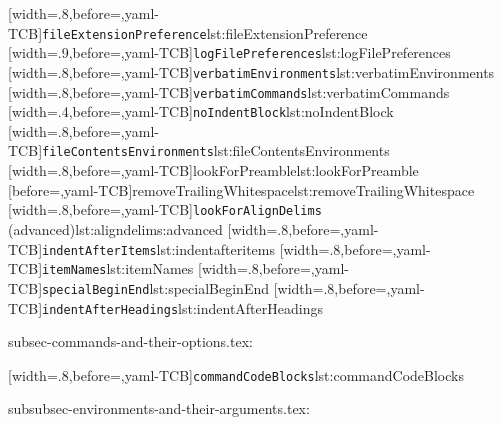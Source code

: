 [width=.8\linewidth,before=\centering,yaml-TCB]{\texttt{fileExtensionPreference}}{lst:fileExtensionPreference}
[width=.9\linewidth,before=\centering,yaml-TCB]{\texttt{logFilePreferences}}{lst:logFilePreferences}
[width=.8\linewidth,before=\centering,yaml-TCB]{\texttt{verbatimEnvironments}}{lst:verbatimEnvironments}
[width=.8\linewidth,before=\centering,yaml-TCB]{\texttt{verbatimCommands}}{lst:verbatimCommands}
[width=.4\linewidth,before=\centering,yaml-TCB]{\texttt{noIndentBlock}}{lst:noIndentBlock}
[width=.8\linewidth,before=\centering,yaml-TCB]{\texttt{fileContentsEnvironments}}{lst:fileContentsEnvironments}
[width=.8\linewidth,before=\centering,yaml-TCB]{lookForPreamble}{lst:lookForPreamble}
[before=\centering,yaml-TCB]{removeTrailingWhitespace}{lst:removeTrailingWhitespace}
[width=.8\linewidth,before=\centering,yaml-TCB]{\texttt{lookForAlignDelims} (advanced)}{lst:aligndelims:advanced}
[width=.8\linewidth,before=\centering,yaml-TCB]{\texttt{indentAfterItems}}{lst:indentafteritems}
[width=.8\linewidth,before=\centering,yaml-TCB]{\texttt{itemNames}}{lst:itemNames}
[width=.8\linewidth,before=\centering,yaml-TCB]{\texttt{specialBeginEnd}}{lst:specialBeginEnd}
[width=.8\linewidth,before=\centering,yaml-TCB]{\texttt{indentAfterHeadings}}{lst:indentAfterHeadings}

subsec-commands-and-their-options.tex:

[width=.8\linewidth,before=\centering,yaml-TCB]{\texttt{commandCodeBlocks}}{lst:commandCodeBlocks}

subsubsec-environments-and-their-arguments.tex:

